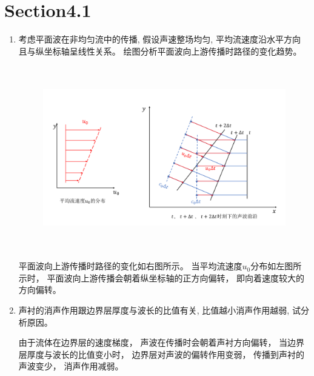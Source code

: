 \section*{Section4.1}

\begin{enumerate}
    \item 考虑平面波在非均匀流中的传播, 
    假设声速整场均匀, 平均流速度沿水平方向 且与纵坐标轴呈线性关系。
    绘图分析平面波向上游传播时路径的变化趋势。
        \vspace{-0.5cm}
        \begin{figure}[htbp]
            \centering
            \includegraphics[height=8cm]{image/Section4.1_1.pdf}
        \end{figure}
        
        平面波向上游传播时路径的变化如右图所示。
        当平均流速度\(u_{0}\)分布如左图所示时，
        平面波向上游传播会朝着纵坐标轴的正方向偏转，
        即向着速度较大的方向偏转。

    \item 声衬的消声作用跟边界层厚度与波长的比值有关,
    比值越小消声作用越弱, 试分析原因。
        
    由于流体在边界层的速度梯度，
    声波在传播时会朝着声衬方向偏转，
    当边界层厚度与波长的比值变小时，
    边界层对声波的偏转作用变弱，
    传播到声衬的声波变少，
    消声作用减弱。

\end{enumerate}

\clearpage